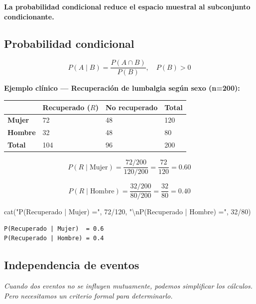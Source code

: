 \documentclass[
  letterpaper,
  DIV=11,
  numbers=noendperiod]{scrartcl}
\newenvironment{Shaded}{\begin{snugshade}}{\end{snugshade}}
\newcommand{\DecValTok}[1]{\textcolor[rgb]{0.68,0.00,0.00}{#1}}
\newcommand{\FunctionTok}[1]{\textcolor[rgb]{0.28,0.35,0.67}{#1}}
\newcommand{\NormalTok}[1]{\textcolor[rgb]{0.00,0.23,0.31}{#1}}
\newcommand{\SpecialCharTok}[1]{\textcolor[rgb]{0.37,0.37,0.37}{#1}}
\newcommand{\StringTok}[1]{\textcolor[rgb]{0.13,0.47,0.30}{#1}}
\newcounter{none} %
\begin{document}
\textbf{La probabilidad condicional reduce el espacio muestral al
subconjunto condicionante.}

\subsection{Probabilidad condicional}\label{probabilidad-condicional}

\[P(A \mid B) = \frac{P(A \cap B)}{P(B)}, \quad P(B) > 0\]

\textbf{Ejemplo clínico --- Recuperación de lumbalgia según sexo
(n=200):}

{\def\LTcaptype{none} %
\begin{longtable}[]{@{}llll@{}}
\toprule\noalign{}
& Recuperado (\(R\)) & No recuperado & Total \\
\midrule\noalign{}
\endhead
\bottomrule\noalign{}
\endlastfoot
\textbf{Mujer} & 72 & 48 & 120 \\
\textbf{Hombre} & 32 & 48 & 80 \\
\textbf{Total} & 104 & 96 & 200 \\
\end{longtable}
}

\[P(R \mid \text{Mujer}) = \frac{72/200}{120/200} = \frac{72}{120} = 0.60\]

\[P(R \mid \text{Hombre}) = \frac{32/200}{80/200} = \frac{32}{80} = 0.40\]

\begin{Shaded}
\begin{Highlighting}[]
\FunctionTok{cat}\NormalTok{(}\StringTok{"P(Recuperado | Mujer)  ="}\NormalTok{, }\DecValTok{72}\SpecialCharTok{/}\DecValTok{120}\NormalTok{,}
    \StringTok{"}\SpecialCharTok{\textbackslash{}n}\StringTok{P(Recuperado | Hombre) ="}\NormalTok{, }\DecValTok{32}\SpecialCharTok{/}\DecValTok{80}\NormalTok{)}
\end{Highlighting}
\end{Shaded}

\begin{verbatim}
P(Recuperado | Mujer)  = 0.6 
P(Recuperado | Hombre) = 0.4
\end{verbatim}

\subsection{Independencia de eventos}\label{independencia-de-eventos}

\emph{Cuando dos eventos no se influyen mutuamente, podemos simplificar
los cálculos. Pero necesitamos un criterio formal para determinarlo.}
\end{document}
